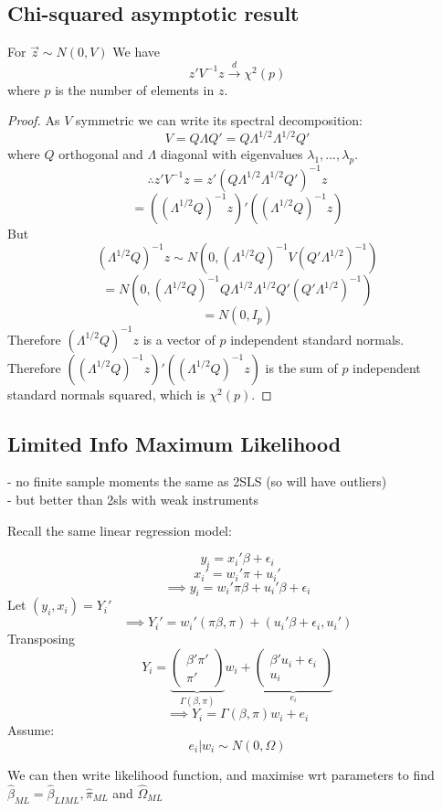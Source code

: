 \documentclass[DIV=14,titlepage=false]{scrreprt}
\begin{document}
\subsection{Chi-squared asymptotic result}
\vspace{5mm}
\begin{lemma}
For \(\vec z\sim N(0,V)\)
We have \[z'V^{-1}z\xrightarrow{d}\chi^2(p)\]
where \(p\) is the number of elements in \(z\).
\end{lemma}
\vspace{5mm}
\begin{proof}
    As \(V\) symmetric we can write its spectral decomposition:
    \[V=Q\Lambda Q'=Q\Lambda^{1/2}\Lambda^{1/2}Q'\]
    where \(Q\) orthogonal and \(\Lambda\) diagonal with eigenvalues \(\lambda_1,...,\lambda_p\).
    \[\therefore z'V^{-1}z=z'(Q\Lambda^{1/2}\Lambda^{1/2}Q')^{-1}z\]
    \[=((\Lambda^{1/2}Q)^{-1}z)'((\Lambda^{1/2}Q)^{-1}z)\]
    But
    \[(\Lambda^{1/2}Q)^{-1}z\sim N(0,(\Lambda^{1/2}Q)^{-1}V(Q'\Lambda^{1/2})^{-1})\]
    \[=N(0,(\Lambda^{1/2}Q)^{-1}Q\Lambda^{1/2}\Lambda^{1/2}Q'(Q'\Lambda^{1/2})^{-1})\]
    \[=N(0,I_p)\]
    Therefore \((\Lambda^{1/2}Q)^{-1}z\) is a vector of \(p\) independent standard normals.
    \\ Therefore \(((\Lambda^{1/2}Q)^{-1}z)'((\Lambda^{1/2}Q)^{-1}z)\) is the sum of \(p\) independent standard normals squared, which is \(\chi^2(p)\). 
\end{proof}

\subsection{Limited Info Maximum Likelihood}
- no finite sample moments the same as 2SLS (so will have outliers)
\\ - but better than 2sls with weak instruments

Recall the same linear regression model:

\[y_i=x_i'\beta+\epsilon_i\]
\[x_i'=w_i'\pi+u_i'\]
\[\implies y_i=w_i'\pi\beta+u_i'\beta+\epsilon_i\]
Let \((y_i,x_i) = Y_i'\)
\[\implies Y_i'=w_i'(\pi\beta, \pi)+(u_i'\beta+\epsilon_i, u_i')\]
Transposing
\[Y_i=\underbrace{\begin{pmatrix} \beta'\pi' \\ \pi'\end{pmatrix}}_{\Gamma(\beta,\pi)}w_i+\underbrace{\begin{pmatrix} \beta'u_i+\epsilon_i \\ u_i\end{pmatrix}}_{e_i}\]
\[\implies Y_i=\Gamma(\beta,\pi)w_i+e_i\]
Assume:
\[e_i|w_i\sim N(0,\Omega)\]

We can then write likelihood function, and maximise wrt parameters to find
\(\hat \beta_{ML}=\hat \beta_{LIML}, \hat \pi_{ML}\) and \(\hat \Omega_{ML}\)
\end{document}
